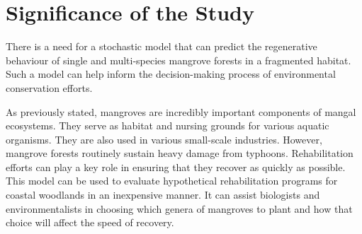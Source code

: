 \section{Significance of the Study}
There is a need for a stochastic model that can predict the regenerative behaviour of single and multi-species mangrove forests in a fragmented habitat. Such a model can help inform the decision-making process of environmental conservation efforts. 

As previously stated, mangroves are incredibly important components of mangal ecosystems. They serve as habitat and nursing grounds for various aquatic organisms. They are also used in various small-scale industries. However, mangrove forests routinely sustain heavy damage from typhoons. Rehabilitation efforts can play a key role in ensuring that they recover as quickly as possible. This model can be used to evaluate hypothetical rehabilitation programs for coastal woodlands in an inexpensive manner. It can assist biologists and environmentalists in choosing which genera of mangroves to plant and how that choice will affect the speed of recovery.
